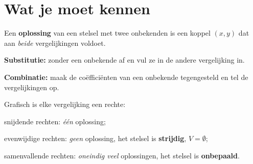 %



\section{Wat je moet kennen}

\begin{theorie}
\begin{minipage}[t]{.47\linewidth}
\vspace{0pt}
Een \textbf{\textcolor{accent}{oplossing}} van een stelsel met twee onbekenden is een koppel $(x, y)$ dat aan \emph{beide} vergelijkingen voldoet.

\vspace{1mm}
\textbf{\textcolor{accent}{Substitutie:}} zonder een onbekende af en vul ze in de andere vergelijking in.

\vspace{1mm}
\textbf{\textcolor{accent}{Combinatie:}} maak de coëfficiënten van een onbekende tegengesteld en tel de vergelijkingen op.
\end{minipage}\hfill
\begin{minipage}[t]{.48\linewidth}
\vspace{0pt}
Grafisch is elke vergelijking een rechte:

\vspace{1mm}
snijdende rechten: \emph{één} oplossing;

evenwijdige rechten: \emph{geen} oplossing, het stelsel is \textbf{\textcolor{accent}{strijdig}}, $V = \emptyset$;

samenvallende rechten: \emph{oneindig veel} oplossingen, het stelsel is \textbf{\textcolor{accent}{onbepaald}}.
\end{minipage}
\end{theorie}

